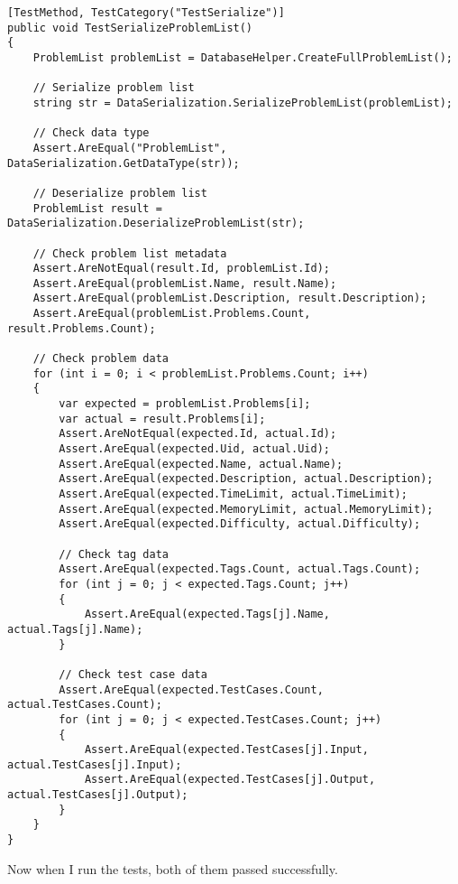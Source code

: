 \documentclass[report.tex]{subfiles}
\begin{document}
\begin{verbatim}
[TestMethod, TestCategory("TestSerialize")]
public void TestSerializeProblemList()
{
    ProblemList problemList = DatabaseHelper.CreateFullProblemList();
    
    // Serialize problem list
    string str = DataSerialization.SerializeProblemList(problemList);
    
    // Check data type
    Assert.AreEqual("ProblemList", DataSerialization.GetDataType(str));

    // Deserialize problem list
    ProblemList result = DataSerialization.DeserializeProblemList(str);
    
    // Check problem list metadata
    Assert.AreNotEqual(result.Id, problemList.Id);
    Assert.AreEqual(problemList.Name, result.Name);
    Assert.AreEqual(problemList.Description, result.Description);
    Assert.AreEqual(problemList.Problems.Count, result.Problems.Count);
    
    // Check problem data
    for (int i = 0; i < problemList.Problems.Count; i++)
    {
        var expected = problemList.Problems[i];
        var actual = result.Problems[i];
        Assert.AreNotEqual(expected.Id, actual.Id);
        Assert.AreEqual(expected.Uid, actual.Uid);
        Assert.AreEqual(expected.Name, actual.Name);
        Assert.AreEqual(expected.Description, actual.Description);
        Assert.AreEqual(expected.TimeLimit, actual.TimeLimit);
        Assert.AreEqual(expected.MemoryLimit, actual.MemoryLimit);
        Assert.AreEqual(expected.Difficulty, actual.Difficulty);
        
        // Check tag data
        Assert.AreEqual(expected.Tags.Count, actual.Tags.Count);
        for (int j = 0; j < expected.Tags.Count; j++)
        {
            Assert.AreEqual(expected.Tags[j].Name, actual.Tags[j].Name);
        }

        // Check test case data
        Assert.AreEqual(expected.TestCases.Count, actual.TestCases.Count);
        for (int j = 0; j < expected.TestCases.Count; j++)
        {
            Assert.AreEqual(expected.TestCases[j].Input, actual.TestCases[j].Input);
            Assert.AreEqual(expected.TestCases[j].Output, actual.TestCases[j].Output);
        }
    }
}
\end{verbatim}

Now when I run the tests, both of them passed successfully.
\end{document}
